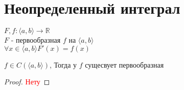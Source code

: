 \documentclass[12pt]{article}
\begin{document}
\section{Неопределенный интеграл}
\begin{definition}[Первообразная]
  $F, f: \langle a, b \rangle \rightarrow \mathbb{R}$ \\ 
  $F$ - первообразная $f$ на $\langle a, b \rangle$ \\
  $\forall x \in \langle a, b \rangle F'(x) = f(x)$
\end{definition}
\begin{theorem}
 $f \in C(\langle a, b \rangle)$, Тогда у $f$ сущесвует первообразная 
\end{theorem}
\begin{proof}
  \textcolor{red}{Нету} %
\end{proof}
\end{document}
